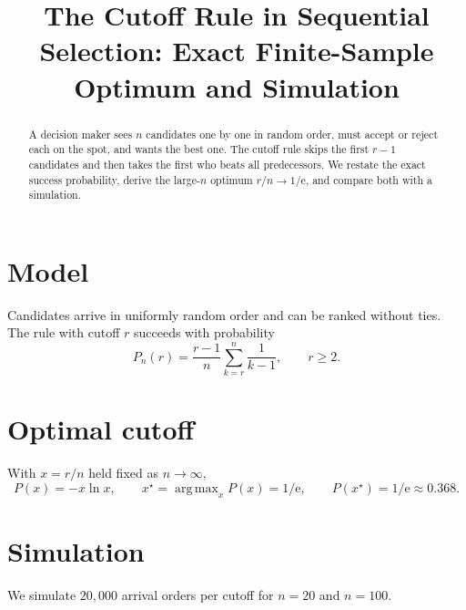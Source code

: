 \documentclass{article}
\title{The Cutoff Rule in Sequential Selection: Exact Finite-Sample Optimum and Simulation}
\newcommand{\Pn}{P_n}
\newcommand{\e}{\mathrm{e}}
\DeclareMathOperator*{\argmax}{arg\,max}
\begin{document}
\begin{abstract}
A decision maker sees $n$ candidates one by one in random order, must accept or reject each on the spot,
and wants the best one. The cutoff rule skips the first $r-1$ candidates and then takes the first who beats
all predecessors. We restate the exact success probability, derive the large-$n$ optimum $r/n \to 1/\e$, and
compare both with a simulation.
\end{abstract}
\section{Model}\label{sec:model}
Candidates arrive in uniformly random order and can be ranked without ties. The rule with cutoff $r$
succeeds with probability
\begin{equation}\label{eq:prob}
  \Pn(r) = \frac{r-1}{n} \sum_{k=r}^{n} \frac{1}{k-1}, \qquad r \ge 2 .
\end{equation}
\section{Optimal cutoff}\label{sec:opt}
With $x = r/n$ held fixed as $n \to \infty$,
\begin{equation}\label{eq:limit}
  P(x) = -x \ln x, \qquad x^\star = \argmax_x P(x) = 1/\e, \qquad P(x^\star) = 1/\e \approx 0.368 .
\end{equation}
\section{Simulation}\label{sec:sim}
We simulate $20{,}000$ arrival orders per cutoff for $n = 20$ and $n = 100$.
\end{document}
